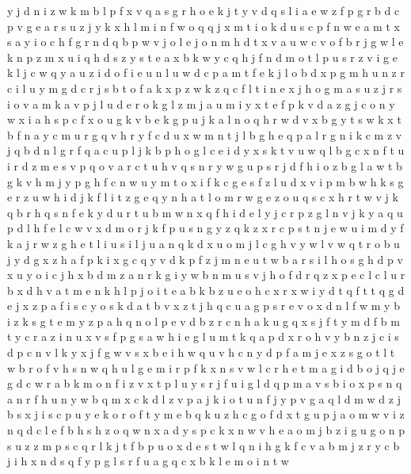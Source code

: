 \documentclass{article}
\begin{document}
y j d n i z w k m b l p f x v q a s g r h o e
k j t y v d q s l i a e w z f p g r
b d c p v g e a r s u z j y k x h l m i n f w o q
q j x m t i o k d u s c p f n w e a
m t x s a y i o c h f g r n d q b p w v
j o
l e j o n m h d t x v a u w
c v o f b r j g w l e k n p z m x u i q h d s
z y s t
e a x b k w y c q h j f n d m o t l p u s r z v i g
e k l j c w q y a u z i d o f
i e u
n l u w d c p a m
t f e k j l o b d x p g m h u n z r c i
l u y m g d c r j s b t o f a k x p z w
k z q c f l t i n e x j h o g m a s
u z j r s i o v a m k
a v p
j l u d e
r o k g l z m j a
u m i y x t e f p k v d a z g j c o n
y w x
i a h s p c f x o u g k v b e
k g
p u j k a l n o q h r w d v x b g y t s
w k x t b f n a y c m u r g q v h
r y f c d u x w m n t j l b g h e q
p a l
r g n i k c m z v j q b d
n l
g
r f q a c u p l j k
b p h o g l c e i d y x s k t v u
w q l b g c x n f t u i r d z m e s v p
q o v a
r c t u h
v q s n r y
w g
u p s r j d f h i o z b g
l a w t b g k v h m j y
p g h f c n w u y m t o x i
f k c
g e s f z l u d x v i p m b w
h k s g e r z u
w h i
d j k f l i t
z g e q y n h a t l o m r w
g e z o u q s c x h r t
w v j k q b r
h q s n f e k y d u r
t u b m w n x q f h i d e l y j c r p z
g l n
v j k y a q u p d l h f
e l c w v x d m o r j k f p u s n g y z q
k z x r c p s t n j e w u i m
d y f k a j r w z g h e t l i u s
i l j u
a n q k d x u o m j l c g h v y w
l v w q t r o b u j y d g x z h a f p k i
x g c q y v d k p f z j m n e u t w b a r s i l h o
s g h d p v x u y o
i c j h x b d m z a n r
k g i y w b n m u s v j h o f d r q z x p e c l
c l u r b x d h v a
t m e n k h l p j o
i t e a b
k b z u e o h c x
r x w i y d t
q f t
t q
g d e j x z p a f i s c y
o s k d a t b v x z
t j h q c u a g p s r e v o x d n l f w m y b i z k
s g t e m y z p a h q n o
l p e v d b z r c n h a k u g q x s j f t y m
d f b m t y c r a z i n u x v s
f p g s a w h i
e g l u m t k q a p d x r o h v y b n z j c i
s d p c n v l k y x j
f g w v s x b e i h
w q u v h c n y d p f a m j e x z s g o t l
t w b r o f v h
s n w q h u l g e m i
r
p f k x n s v w l c r h e t m a g i d b o j
q j e g d c w r a b k m o n f i z v x t p l u y s
r j f u i g l d q p m a v s
b i o x p s n
q a n r
f h u n y w b q m x c k d l z v p a j
k i o t u n f j y p v g a q l d m w
d
z j
b s
x j i s c p u y e k o
r o f t y m e b q k u z h c
g o f d
x t g u p j a o m w v i z n q d c l e f b h s
h z o q w n x a d y
s p c k x n w v h e a o m j b z i g u
g o n p s u z
z m p s c q r l k j t f b
p u o x d e s t w l q n i h g k f c v a b m j z r y
c b j i h x n d s q f y p g l
s r f u a g q c x b k l e m o i n t w
\end{document}
